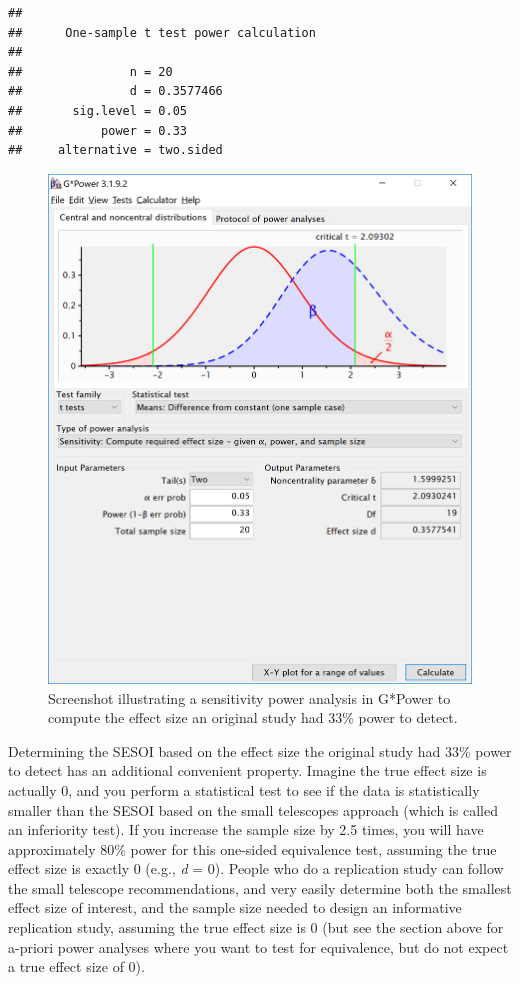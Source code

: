 \documentclass[
  oneside]{book}
\begin{document}
\begin{verbatim}
## 
##      One-sample t test power calculation 
## 
##               n = 20
##               d = 0.3577466
##       sig.level = 0.05
##           power = 0.33
##     alternative = two.sided
\end{verbatim}



\begin{figure}

{\centering \includegraphics[width=1\linewidth]{images/0deabffd850f7b63c16e41e0af9ae0b6} 

}

\caption{Screenshot illustrating a sensitivity power analysis in G*Power to compute the effect size an original study had 33\% power to detect.}\label{fig:smalltelpower}
\end{figure}

Determining the SESOI based on the effect size the original study had 33\% power to detect has an additional convenient property. Imagine the true effect size is actually 0, and you perform a statistical test to see if the data is statistically smaller than the SESOI based on the small telescopes approach (which is called an inferiority test). If you increase the sample size by 2.5 times, you will have approximately 80\% power for this one-sided equivalence test, assuming the true effect size is exactly 0 (e.g., \emph{d} = 0). People who do a replication study can follow the small telescope recommendations, and very easily determine both the smallest effect size of interest, and the sample size needed to design an informative replication study, assuming the true effect size is 0 (but see the section above for a-priori power analyses where you want to test for equivalence, but do not expect a true effect size of 0).
\end{document}
